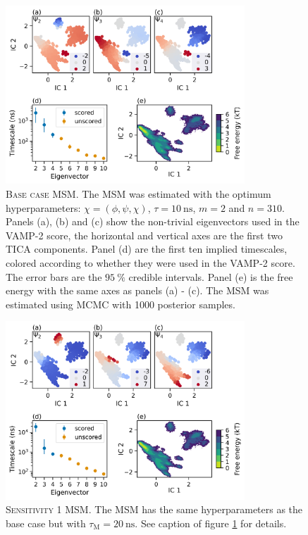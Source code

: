 \begin{figure}
    \centering
    \includegraphics[width=0.8\textwidth]{chapters/msm_optimization/figures/aadh_msm_best.png}
    \caption[Base case MSM]{\textsc{Base case MSM}. The MSM was estimated with the optimum hyperparameters: $\chi= (\phi, \psi, \chi)$, $\tau=\SI{10}{\nano\second}$, $m=2$ and $n=310$. Panels (a), (b) and (c) show the non-trivial eigenvectors used in the VAMP-2 score, the horizontal and vertical axes are the first two TICA components. Panel (d) are the first ten implied timescales, colored according to whether they were used in the VAMP-2 score. The error bars are the $\SI{95}{\percent}$ credible intervals.  Panel (e) is the free energy with the same axes as panels (a) - (c). The MSM was estimated using MCMC with \num{1000} posterior samples.}
    \label{fig:aadh_msm_best}
\end{figure}

\begin{figure}
    \centering
    \includegraphics[width=0.8\textwidth]{chapters/msm_optimization/figures/aadh_msm_sens_1.png}
    \caption[Sensitivity 1 MSM]{\textsc{Sensitivity 1 MSM}. The MSM has the same hyperparameters as the base case but with $\tau_{\mathrm{M}}=\SI{20}{\nano\second}$. See caption of figure \ref{fig:aadh_msm_best} for details.}
    \label{fig:aadh_msm_sens_1}
\end{figure}

